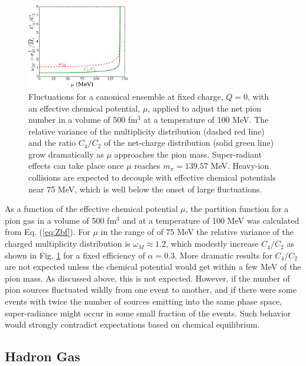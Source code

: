 \begin{figure}
\centerline{\includegraphics[width=0.4\textwidth]{figs/C4_bose}}
\caption{\label{fig:cheapbose}
Fluctuations for a canonical ensemble at fixed charge, $Q=0$, with an effective chemical potential, $\mu$, applied to adjust the net pion number in a volume of 500 fm$^3$ at a temperature of 100 MeV. The relative variance of the multiplicity distribution (dashed red line) and the ratio $C_4/C_2$ of the net-charge distribution (solid green line) grow dramatically as $\mu$ approaches the pion mass. Super-radiant effects can take place once $\mu$ reaches $m_\pi=139.57$ MeV. Heavy-ion collisions are expected to decouple with effective chemical potentials near 75 MeV, which is well below the onset of large fluctuations.
}
\end{figure}
As a function of the effective chemical potential $\mu$, the partition function for a pion gas in a volume of 500 fm$^3$ and at a temperature of 100 MeV was calculated from Eq. (\ref{eq:Zbf}). For $\mu$ in the range of of 75 MeV the relative variance of the charged multiplicity distribution is $\omega_M\approx 1.2$, which modestly increase $C_4/C_2$ as shown in Fig. \ref{fig:cheapbose} for a fixed efficiency of $\alpha=0.3$. More dramatic results for $C_4/C_2$ are not expected unless the chemical potential would get within a few MeV of the pion mass. As discussed above, this is not expected. However, if the number of pion sources fluctuated wildly from one event to another, and if there were some events with twice the number of sources emitting into the same phase space, super-radiance might occur in some small fraction of the events. Such behavior would strongly contradict expectations based on chemical equilibrium. 


\subsection{Hadron Gas}\label{sec:hadrongas_cheap}

